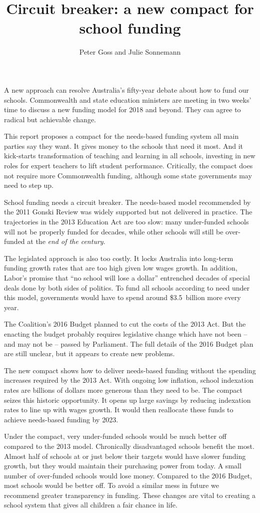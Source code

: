 \documentclass{grattan}
\title{Circuit breaker: a new compact for school funding}
\author{Peter Goss and Julie Sonnemann}
\begin{document}
%
\begin{overview}

A new approach can resolve Australia's fifty-year debate about how to fund our schools.
Commonwealth and state education ministers are meeting in two weeks' time to discuss a new funding model for 2018 and beyond.
They can agree to radical but achievable change.

This report proposes a compact for the needs-based funding system all main parties say they want.
It gives money to the schools that need it most.
And it kick-starts transformation of teaching and learning in all schools, investing in new roles for expert teachers to lift student performance. Critically, the compact does not require more Commonwealth funding, although some state governments may need to step up.

School funding needs a circuit breaker.
The needs-based model recommended by the 2011 Gonski Review was widely supported but not delivered in practice.
The trajectories in the 2013 Education Act are too slow: many under-funded schools will not be properly funded for decades, while other schools will still be over-funded at the \emph{end of the century}.

The legislated approach is also too costly.
It locks Australia into long-term funding growth rates that are too high given low wages growth.
In addition, Labor's promise that ``no school will lose a dollar'' entrenched decades of special deals done by both sides of politics.
To fund all schools according to need under this model, governments would have to spend around \$3.5~billion more every year.

The Coalition's 2016 Budget planned to cut the costs of the 2013 Act.
But the enacting the budget probably requires legislative change which have not been -- and may not be -- passed by Parliament.
The full details of the 2016 Budget plan are still unclear, but it appears
to create new problems.

The new compact shows how to deliver needs-based funding without the spending increases required by the 2013 Act.
With ongoing low inflation, school indexation rates are billions of dollars more generous than they need to be.
The compact seizes this historic opportunity.
It opens up large savings by reducing indexation rates to line up with wages growth.
It would then reallocate these funds to achieve needs-based funding by 2023.

Under the compact, very under-funded schools would be much better off compared to the 2013 model.
Chronically disadvantaged schools benefit the most.
Almost half of schools at or just below their targets would have slower funding growth, but they would maintain their purchasing power from today.
A small number of over-funded schools would lose money.
Compared to the 2016 Budget, most schools would be better off.
To avoid a similar mess in future we recommend greater transparency in funding.
These changes are vital to creating a school system that gives all children a fair chance in life.


\end{overview}
\end{document}
